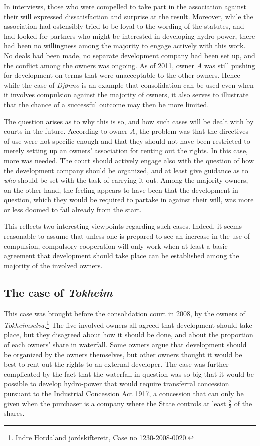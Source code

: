 In interviews, those who were compelled to take part in the association against their will expressed dissatisfaction and surprise at the result. Moreover, while the association had ostensibly tried to be loyal to the wording of the statutes, and had looked for partners who might be interested in developing hydro-power, there had been no willingness among the majority to engage actively with this work. No deals had been made, no separate development company had been set up, and the conflict among the owners was ongoing. As of 2011, owner $A$ was still pushing for development on terms that were unacceptable to the other owners. Hence while the case of \emph{Djønno} is an example that consolidation can be used even when it involves compulsion against the majority of owners, it also serves to illustrate that the chance of a successful outcome may then be more limited.

The question arises as to why this is so, and how such cases will be dealt with by courts in the future. According to owner $A$, the problem was that the directives of use were not specific enough and that they should not have been restricted to merely setting up an owners' association for renting out the rights. In this case, more was needed. The court should actively engage also with the question of how the development company should be organized, and at least give guidance as to \emph{who} should be set with the task of carrying it out. Among the majority owners, on the other hand, the feeling appears to have been that the development in question, which they would be required to partake in against their will, was more or less doomed to fail already from the start.

This reflects two interesting viewpoints regarding such cases. Indeed, it seems reasonable to assume that unless one is prepared to see an increase in the use of compulsion, compulsory cooperation will only work when at least a basic agreement that development should take place can be established among the majority of the involved owners.

\subsection{The case of \emph{Tokheim}}

This case was brought before the consolidation court in 2008, by the owners of \emph{Tokheimselva}.\footnote{Indre Hordaland jordskifterett, Case no 1230-2008-0020.} The five involved owners all agreed that development should take place, but they disagreed about how it should be done, and about the proportion of each owners' share in waterfall. Some owners argue that development should be organized by the owners themselves, but other owners thought it would be best to rent out the rights to an external developer. The case was further complicated by the fact that the waterfall in question was so big that it would be possible to develop hydro-power that would require transferral concession pursuant to the Industrial Concession Act 1917, a concession that can only be given when the purchaser is a company where the State controls at least $\frac{2}{3}$ of the shares. 

